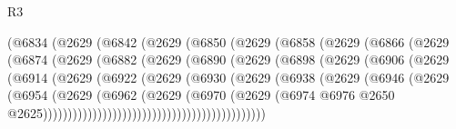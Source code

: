 \begin{lexlean}{R3}
\begin{coremodule}
                    (@6834
                      (@2629
                        (@6842
                          (@2629
                            (@6850
                              (@2629
                                (@6858
                                  (@2629
                                    (@6866
                                      (@2629
                                        (@6874
                                          (@2629
                                            (@6882
                                              (@2629
                                                (@6890
                                                  (@2629
                                                    (@6898
                                                      (@2629
                                                        (@6906
                                                          (@2629
                                                            (@6914
                                                              (@2629
                                                                (@6922
                                                                  (@2629
                                                                    (@6930
                                                                      (@2629
                                                                        (@6938
                                                                          (@2629
                                                                            (@6946
                                                                              (@2629
                                                                                (@6954
                                                                                  (@2629
                                                                                    (@6962
                                                                                      (@2629
                                                                                        (@6970
                                                                                          (@2629
                                                                                            (@6974
                                                                                              @6976
                                                                                              @2650
                                                                                              @2625)))))))))))))))))))))))))))))))))))))))))))))

\end{coremodule}
\end{lexlean}
